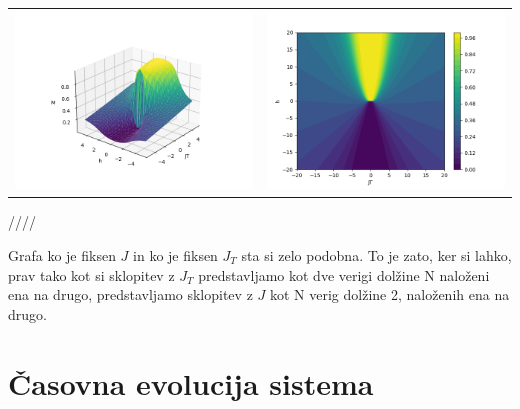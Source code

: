 \documentclass{article}
\begin{document}
\begin{tabular}{c c}
     \includegraphics[width = .5 \linewidth]{2TFIM1.png}
     &  
     \includegraphics[width = .5 \linewidth]{2TFIM2.png}\\
\end{tabular}////

\noindent Grafa ko je fiksen $J$ in ko je fiksen $J_T$ sta si zelo podobna. To je zato, ker si lahko, prav tako kot si sklopitev z $J_T$ predstavljamo kot dve verigi dolžine N naloženi ena na drugo, predstavljamo sklopitev z $J$ kot N verig dolžine 2, naloženih ena na drugo.

\section{Časovna evolucija sistema}
\end{document}
